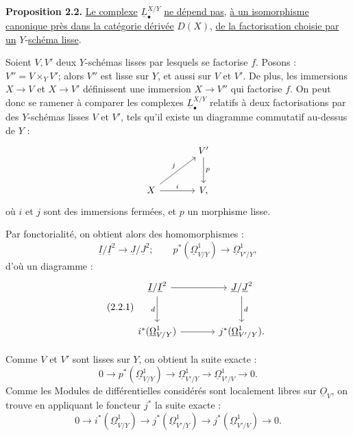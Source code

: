 
\textbf{Proposition 2.2.} \uline{Le complexe} $\underline{L}^{X/Y}_\bullet$ \uline{ne dépend pas}, \uline{à un isomorphisme canonique près dans la catégorie dérivée} $D(X)$, \uline{de la factorisation choisie par un} $Y$-\uline{schéma lisse}.

Soient $V,V'$ deux $Y$-schémas lisses par lesquels se factorise $f$. Posons : $V''=V\times_Y V'$; alors $V''$ est lisse sur $Y$, et aussi sur $V$ et $V'$. De plus, les immersions $X\to V$ et $X\to V'$ définissent une immersion $X\to V''$ qui factorise $f$. On peut donc se ramener à comparer les complexes $\underline{L}^{X/Y}_\bullet$ relatifs à deux factorisations par des $Y$-schémas lisses $V$ et $V'$, tels qu'il existe un diagramme commutatif au-dessus de $Y$ :
\[
\begin{tikzcd}[column sep=large,row sep=large]
& V' \arrow[d,"p"]\\
X \arrow[ur,"j"] \arrow[r,"i"] & V,
\end{tikzcd}
\]
où $i$ et $j$ sont des immersions fermées, et $p$ un morphisme lisse.

Par fonctorialité, on obtient alors des homomorphismes :
\[
\underline{I}/\underline{I}^2\longrightarrow \underline{J}/\underline{J}^2;
\qquad
p^*(\underline{\Omega}^1_{V/Y})\longrightarrow\underline{\Omega}^1_{V'/Y},
\]
d'où un diagramme :
\begin{equation}\tag{2.2.1}
\begin{tikzcd}[column sep=large,row sep=large]
\underline{I}/\underline{I}^2 \arrow[r] \arrow[d,"d"'] & \underline{J}/\underline{J}^2 \arrow[d,"d"]\\
i^*(\underline{\Omega}^1_{V/Y}) \arrow[r] & j^*(\underline{\Omega}^1_{V'/Y}).
\end{tikzcd}
\end{equation}

Comme $V$ et $V'$ sont lisses sur $Y$, on obtient la suite exacte :
\[
0\longrightarrow p^*(\underline{\Omega}^1_{V/Y})\longrightarrow\underline{\Omega}^1_{V'/Y}
\longrightarrow\underline{\Omega}^1_{V'/V}\longrightarrow0.
\]
Comme les Modules de différentielles considérés sont localement libres sur $\underline{O}_V$, on trouve en appliquant le foncteur $j^*$ la suite exacte :
\begin{equation}\tag{2.2.2}
0\longrightarrow i^*(\underline{\Omega}^1_{V/Y})\longrightarrow j^*(\underline{\Omega}^1_{V'/Y})
\longrightarrow j^*(\underline{\Omega}^1_{V'/V})\longrightarrow0.
\end{equation}
